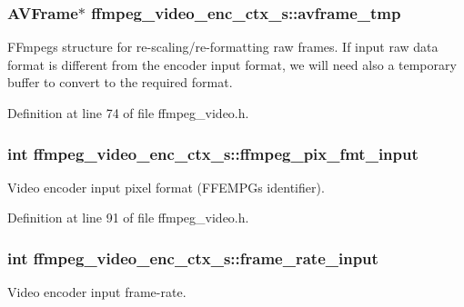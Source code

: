 \subsubsection[{\texorpdfstring{avframe\+\_\+tmp}{avframe_tmp}}]{\setlength{\rightskip}{0pt plus 5cm}A\+V\+Frame$\ast$ ffmpeg\+\_\+video\+\_\+enc\+\_\+ctx\+\_\+s\+::avframe\+\_\+tmp}\hypertarget{structffmpeg__video__enc__ctx__s_a8add1858adf9ad2275ec42a6097f3b4d}{}\label{structffmpeg__video__enc__ctx__s_a8add1858adf9ad2275ec42a6097f3b4d}
F\+Fmpeg\textquotesingle{}s structure for re-\/scaling/re-\/formatting raw frames. If input raw data format is different from the encoder input format, we will need also a temporary buffer to convert to the required format. 

Definition at line 74 of file ffmpeg\+\_\+video.\+h.

\subsubsection[{\texorpdfstring{ffmpeg\+\_\+pix\+\_\+fmt\+\_\+input}{ffmpeg_pix_fmt_input}}]{\setlength{\rightskip}{0pt plus 5cm}int ffmpeg\+\_\+video\+\_\+enc\+\_\+ctx\+\_\+s\+::ffmpeg\+\_\+pix\+\_\+fmt\+\_\+input}\hypertarget{structffmpeg__video__enc__ctx__s_a6e70489ea3eece6d4b9fe3e3d23cab11}{}\label{structffmpeg__video__enc__ctx__s_a6e70489ea3eece6d4b9fe3e3d23cab11}
Video encoder input pixel format (F\+F\+E\+M\+PG\textquotesingle{}s identifier). 

Definition at line 91 of file ffmpeg\+\_\+video.\+h.

\subsubsection[{\texorpdfstring{frame\+\_\+rate\+\_\+input}{frame_rate_input}}]{\setlength{\rightskip}{0pt plus 5cm}int ffmpeg\+\_\+video\+\_\+enc\+\_\+ctx\+\_\+s\+::frame\+\_\+rate\+\_\+input}\hypertarget{structffmpeg__video__enc__ctx__s_a94b8f1af5d95331dc23828ef3e1db400}{}\label{structffmpeg__video__enc__ctx__s_a94b8f1af5d95331dc23828ef3e1db400}
Video encoder input frame-\/rate. 

